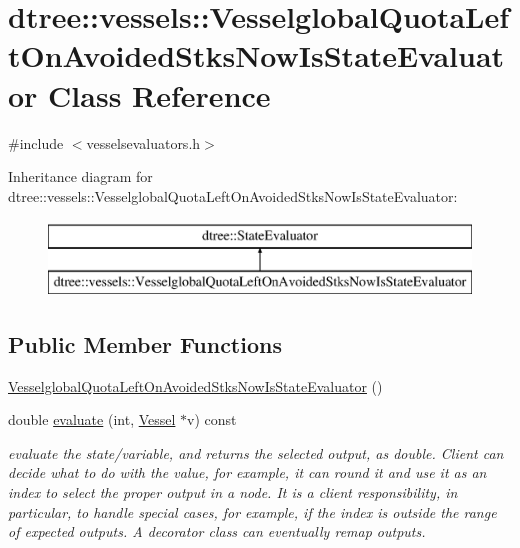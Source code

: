 \hypertarget{classdtree_1_1vessels_1_1_vesselglobal_quota_left_on_avoided_stks_now_is_state_evaluator}{}\section{dtree\+::vessels\+::Vesselglobal\+Quota\+Left\+On\+Avoided\+Stks\+Now\+Is\+State\+Evaluator Class Reference}
\label{classdtree_1_1vessels_1_1_vesselglobal_quota_left_on_avoided_stks_now_is_state_evaluator}


{\ttfamily \#include $<$vesselsevaluators.\+h$>$}

Inheritance diagram for dtree\+::vessels\+::Vesselglobal\+Quota\+Left\+On\+Avoided\+Stks\+Now\+Is\+State\+Evaluator\+:\begin{figure}[H]
\begin{center}
\leavevmode
\includegraphics[height=2.000000cm]{d3/df1/classdtree_1_1vessels_1_1_vesselglobal_quota_left_on_avoided_stks_now_is_state_evaluator}
\end{center}
\end{figure}
\subsection*{Public Member Functions}
\begin{DoxyCompactItemize}
\item 
\mbox{\hyperlink{classdtree_1_1vessels_1_1_vesselglobal_quota_left_on_avoided_stks_now_is_state_evaluator_a93474ecac42a488fa5689c1454353249}{Vesselglobal\+Quota\+Left\+On\+Avoided\+Stks\+Now\+Is\+State\+Evaluator}} ()
\item 
double \mbox{\hyperlink{classdtree_1_1vessels_1_1_vesselglobal_quota_left_on_avoided_stks_now_is_state_evaluator_a016c08490d4e7d2a0f3d57ebc59e58bb}{evaluate}} (int, \mbox{\hyperlink{class_vessel}{Vessel}} $\ast$v) const
\begin{DoxyCompactList}\small\item\em evaluate the state/variable, and returns the selected output, as double. Client can decide what to do with the value, for example, it can round it and use it as an index to select the proper output in a node. It is a client responsibility, in particular, to handle special cases, for example, if the index is outside the range of expected outputs. A decorator class can eventually remap outputs. \end{DoxyCompactList}\end{DoxyCompactItemize}


